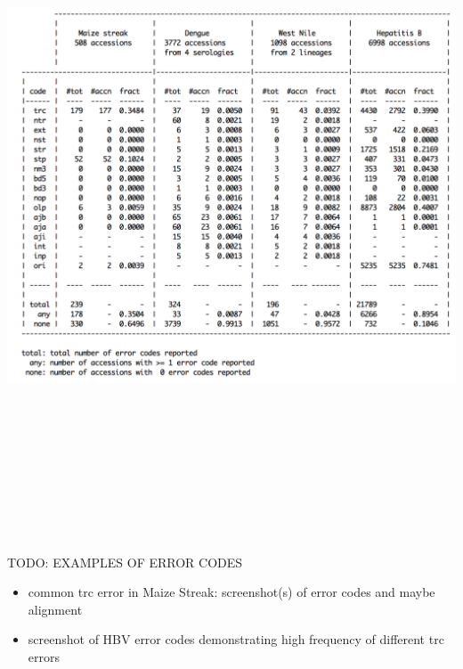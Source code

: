 \documentclass[landscape]{slides}
\begin{document}
\begin{slide}
\begin{center}
\includegraphics[height=8in]{figs/pilot-errcode-table-4}
\vfill
\end{center}
\end{slide}
\begin{slide}
\begin{center}

TODO: EXAMPLES OF ERROR CODES

\begin{itemize}
\item common trc error in Maize Streak: screenshot(s) of error codes and
  maybe alignment
\item screenshot of HBV error codes demonstrating high frequency of
  different trc errors 
\end{itemize}

\vfill
\end{center}
\end{slide}
\end{document}
